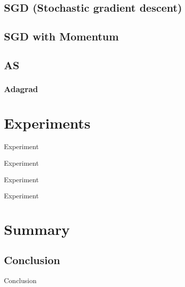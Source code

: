 \documentclass{beamer}
\begin{document}
    \subsection{SGD (Stochastic gradient descent)}
    \begin{frame}
        
    \end{frame}


    \subsection{SGD with Momentum}
    \begin{frame}
    \end{frame}



    \begin{frame}
      \begin{center}
      \end{center}
    \end{frame}


    \subsection{AS}
    \begin{frame}
      \frametitle{Adagrad}
    \end{frame}


    
    \section{Experiments} %
    \begin{frame}{Experiment}
    \end{frame}
    

    \nocite{*}
    \begin{frame}{Experiment}
    \end{frame}

    \begin{frame}{Experiment}
    \end{frame}

    \begin{frame}{Experiment}
    \end{frame}
    

    \section{Summary} %
    \subsection{Conclusion}
    \begin{frame}{Conclusion}

    \end{frame}
\end{document}
